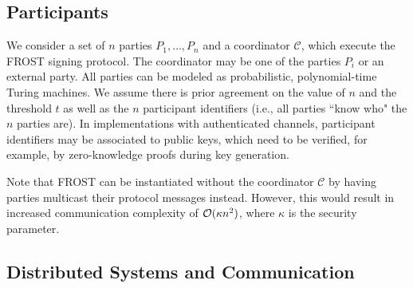 \subsection{Participants}
We consider a set of $n$ parties
$P_1, \dots, P_n$ and a coordinator $\mathcal{C}$, which execute the FROST signing protocol.
The coordinator may be one of the parties $P_i$ or an external party.
All parties can be modeled as probabilistic, polynomial-time Turing machines.
We assume there is prior agreement on the value of $n$ and the threshold $t$ as well as the $n$ participant identifiers (i.e., all parties ``know who" the $n$ parties are).
In implementations with authenticated channels, participant identifiers may be associated to public keys, which need to be verified, for example, by zero-knowledge proofs during key generation.

Note that FROST can be instantiated without the coordinator $\mathcal{C}$ by having parties multicast
 
their protocol messages instead.  However, this would result in increased communication complexity of $\mathcal{O}(\kappa n^2)$, where $\kappa$ is the security parameter.

\subsection{Distributed Systems and Communication}



